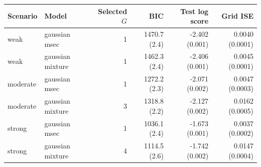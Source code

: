 \begin{tabular}{llrrrr}
\toprule
Scenario & Model & Selected $G$ & BIC & Test log score & Grid ISE \\
\midrule
weak & gaussian msec & 1 & 1470.7 (2.4) & -2.402 (0.001) & 0.0040 (0.0001) \\
weak & gaussian mixture & 1 & 1462.3 (2.4) & -2.406 (0.001) & 0.0045 (0.0001) \\
\addlinespace
moderate & gaussian msec & 1 & 1272.2 (2.3) & -2.071 (0.002) & 0.0047 (0.0003) \\
moderate & gaussian mixture & 3 & 1318.8 (2.2) & -2.127 (0.002) & 0.0162 (0.0005) \\
\addlinespace
strong & gaussian msec & 1 & 1036.1 (2.4) & -1.673 (0.001) & 0.0037 (0.0002) \\
strong & gaussian mixture & 4 & 1114.5 (2.6) & -1.742 (0.002) & 0.0147 (0.0004) \\
\bottomrule
\end{tabular}
